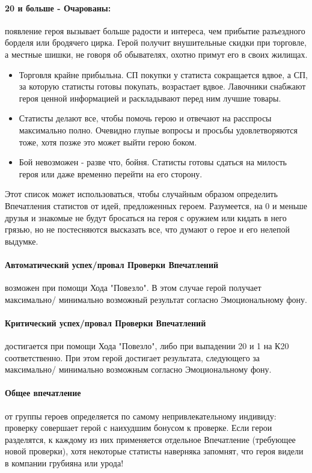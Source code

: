 \paragraph{20 и больше - Очарованы:} появление героя вызывает больше радости и интереса, чем прибытие разъездного борделя или бродячего цирка. Герой получит внушительные скидки при торговле, а местные шишки, не говоря об обывателях, охотно примут его в своих жилищах.
\begin{itemize}
  \item Торговля крайне прибыльна. СП покупки у статиста сокращается вдвое, а СП, за которую статисты готовы покупать, возрастает вдвое. Лавочники снабжают героя ценной информацией и раскладывают перед ним лучшие товары.
  \item Статисты делают все, чтобы помочь герою и отвечают на расспросы максимально полно. Очевидно глупые вопросы и просьбы удовлетворяются тоже, хотя позже это может выйти герою боком.
  \item Бой невозможен - разве что, бойня. Статисты готовы сдаться на милость героя или даже временно перейти на его сторону.
\end{itemize}
\begin{tcolorbox}
  Этот список может использоваться, чтобы случайным образом определить Впечатления статистов от идей, предложенных героем. Разумеется, на 0 и меньше друзья и знакомые не будут бросаться на героя с оружием или кидать в него грязью, но не постесняются высказать все, что думают о герое и его нелепой выдумке.
\end{tcolorbox}

\paragraph{Автоматический успех/провал Проверки Впечатлений} возможен при помощи Хода "Повезло". В этом случае герой получает максимально/ минимально возможный результат согласно Эмоциональному фону.
\paragraph{Критический успех/провал Проверки Впечатлений} достигается при помощи Хода "Повезло", либо при выпадении 20 и 1 на К20 соответственно. При этом герой достигает результата, следующего за максимально/ минимально возможным согласно Эмоциональному фону.

\paragraph{Общее впечатление} от группы героев определяется по самому непривлекательному индивиду: проверку совершает герой с наихудшим бонусом к проверке. Если герои разделятся, к каждому из них применяется отдельное Впечатление (требующее новой проверки), хотя некоторые статисты наверняка запомнят, что героя видели в компании грубияна или урода!

